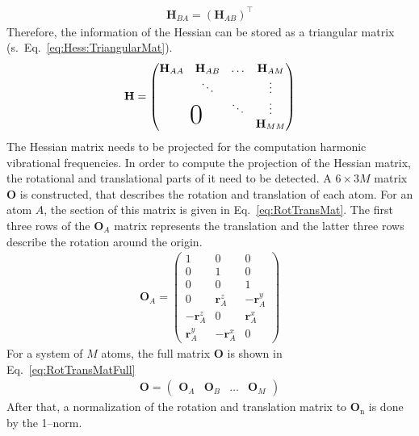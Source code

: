 	\begin{align}
		\label{eq:Hess:HABBA}
		\textbf{H}_{BA} = \left({\textbf{H}_{AB}}\right)^\intercal
	\end{align}
	Therefore, the information of the Hessian can be stored as a triangular matrix (s.~Eq.~\eqref{eq:Hess:TriangularMat}).
	\begin{align}
		\label{eq:Hess:TriangularMat}
		\textbf{H} =
		\left(\begin{matrix}
			\textbf{H}_{AA} & \textbf{H}_{AB} & \hdotsfor{0} &  \textbf{H}_{AM}\\	
			 & \ddots & & \vdots \\
			 & \text{\kern-2em\smash{\raisebox{-2ex}{\Huge 0}}} & \ddots & \vdots \\
			 &  &  & \textbf{H}_{MM} 
		\end{matrix}\right)
	\end{align}
	\newpage
	The Hessian matrix needs to be projected for the computation harmonic vibrational frequencies.
	In order to compute the projection of the Hessian matrix, the rotational and translational parts of it need to be detected.
	A $6 \times 3M$ matrix $\textbf{O}$ is constructed, that describes the rotation and translation of each atom.
	For an atom $A$, the section of this matrix is given in Eq.~\eqref{eq:RotTransMat}.
	The first three rows of the $\textbf{O}_A$ matrix represents the translation and the latter three rows describe the rotation around the origin.
	\begin{align}
		\label{eq:RotTransMat}
		\textbf{O}_A = \left(\begin{matrix}
			1 & 0 & 0 \\
			0 & 1 & 0  \\
			0 & 0 & 1 \\
			0 & \textbf{r}_A^z &  -\textbf{r}_A^y \\
			-\textbf{r}_A^z & 0 & \textbf{r}_A^x   \\
			\textbf{r}_A^y & -\textbf{r}_A^x & 0 
		\end{matrix} \right)
	\end{align}
	For a system of $M$ atoms, the full matrix $\textbf{O}$ is shown in Eq.~\eqref{eq:RotTransMatFull}
	\begin{align}
		\label{eq:RotTransMatFull}
		\textbf{O} = \left(\begin{matrix}
			\textbf{O}_A & \textbf{O}_B &\hdots& \textbf{O}_M 
		\end{matrix}
		\right)
	\end{align}
	After that, a normalization of the rotation and translation matrix to $\textbf{O}_\mathrm{n}$ is done by the 1--norm.
